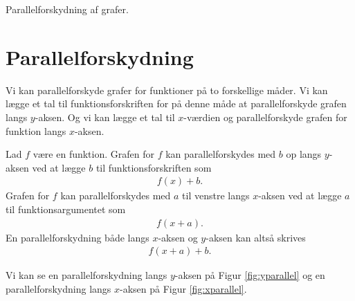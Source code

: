 \begin{center}
	\Huge
	Parallelforskydning af grafer.
\end{center}

\section*{Parallelforskydning}

Vi kan parallelforskyde grafer for funktioner på to forskellige måder. Vi kan lægge et tal til funktionsforskriften for på denne måde at parallelforskyde grafen langs $y$-aksen. Og vi kan lægge et tal til $x$-værdien og parallelforskyde grafen for funktion langs $x$-aksen. 

\begin{setn}[Parallelforskydning]
	Lad $f$ være en funktion. Grafen for $f$ kan parallelforskydes med $b$ op langs $y$-aksen ved at lægge $b$
	til funktionsforskriften som
	\begin{align*}
		f(x) + b.
	\end{align*}
	Grafen for $f$ kan parallelforskydes med $a$ til venstre langs $x$-aksen ved at lægge $a$ til 
	funktionsargumentet som
	\begin{align*}
		f(x + a).
	\end{align*}
	En parallelforskydning både langs $x$-aksen og $y$-aksen kan altså skrives
	\begin{align*}
		f(x + a) + b.
	\end{align*}
\end{setn}
Vi kan se en parallelforskydning langs $y$-aksen på Figur \ref{fig:yparallel} og en parallelforskydning
langs $x$-aksen på Figur \ref{fig:xparallel}.
